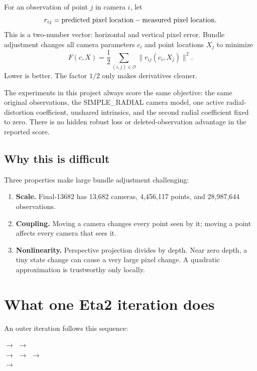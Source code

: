 \documentclass[11pt]{article}
\begin{document}
For an observation of point $j$ in camera $i$, let
\[
  r_{ij}=\hbox{predicted pixel location}-\hbox{measured pixel location}.
\]
This is a two-number vector: horizontal and vertical pixel error.  Bundle adjustment changes all camera parameters $c_i$ and point locations $X_j$ to minimize
\begin{equation}
  F(c,X)=\frac12\sum_{(i,j)\in\mathcal O}\lVert r_{ij}(c_i,X_j)\rVert^2. \label{eq:plain-objective}
\end{equation}
Lower is better.  The factor $1/2$ only makes derivatives cleaner.

The experiments in this project always score the same objective: the same original observations, the SIMPLE\_RADIAL camera model, one active radial-distortion coefficient, unshared intrinsics, and the second radial coefficient fixed to zero.  There is no hidden robust loss or deleted-observation advantage in the reported score.

\subsection{Why this is difficult}

Three properties make large bundle adjustment challenging:

\begin{enumerate}
  \item \textbf{Scale.}  Final-13682 has 13,682 cameras, 4,456,117 points, and 28,987,644 observations.
  \item \textbf{Coupling.}  Moving a camera changes every point seen by it; moving a point affects every camera that sees it.
  \item \textbf{Nonlinearity.}  Perspective projection divides by depth.  Near zero depth, a tiny state change can cause a very large pixel change.  A quadratic approximation is trustworthy only locally.
\end{enumerate}

\section{What one Eta2 iteration does}

An outer iteration follows this sequence:

\begin{center}
$\longrightarrow$
$\longrightarrow$
\\[0.8em]
$\longrightarrow$
$\longrightarrow$
$\longrightarrow$
\\[0.8em]
$\longrightarrow$
\end{center}
\end{document}
